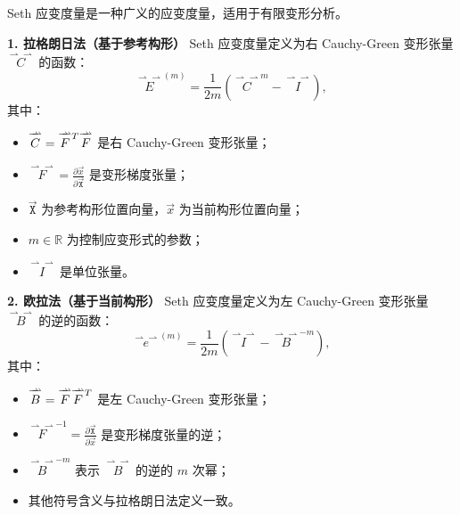 \documentclass[12pt, a4paper, oneside, UTF8]{ctexbook}  %
\newcommand{\vvec}{\overset{\rightharpoonup\!\!\!\! \rightharpoonup}}
\newcommand{\X}{\mathtt{X}}
\newcommand{\lsup}[1]{\raisebox{-0.85ex}{$\scriptstyle #1$}}
\begin{document}
\begin{defn}
	Seth 应变度量是一种广义的应变度量，适用于有限变形分析。
	
	\textbf{1. 拉格朗日法（基于参考构形）}
	Seth 应变度量定义为右 Cauchy-Green 变形张量 \(\vvec{C}\) 的函数：
	\[
	\vvec{E}^{(m)} = \frac{1}{2m} (\vvec{C}^m - \vvec{I}),
	\]
	其中：
	\begin{itemize}
		\item \(\vvec{C} = \vvec{F}^{\lsup{T}} \vvec{F}\) 是右 Cauchy-Green 变形张量；
		\item \(\vvec{F} = \frac{\partial \vec{x}}{\partial \vec{\X}}\) 是变形梯度张量；
		\item \(\vec{\X}\) 为参考构形位置向量，\(\vec{x}\) 为当前构形位置向量；
		\item \(m \in \mathbb{R}\) 为控制应变形式的参数；
		\item \(\vvec{I}\) 是单位张量。
	\end{itemize}

	\textbf{2. 欧拉法（基于当前构形）}
	Seth 应变度量定义为左 Cauchy-Green 变形张量 \(\vvec{B}\) 的逆的函数：
	\[
	\vvec{e}^{(m)} = \frac{1}{2m} (\vvec{I} - \vvec{B}^{-m}),
	\]
	其中：
	\begin{itemize}
    \item \(\vvec{B} = \vvec{F} \vvec{F}^{\lsup{T}}\) 是左 Cauchy-Green 变形张量；
    \item \(\vvec{F}^{-1} = \frac{\partial \vec{\X}}{\partial \vec{x}}\) 是变形梯度张量的逆；
    \item \(\vvec{B}^{-m}\) 表示 \(\vvec{B}\) 的逆的 \(m\) 次幂；
    \item 其他符号含义与拉格朗日法定义一致。
\end{itemize}


\end{defn}
\end{document}
